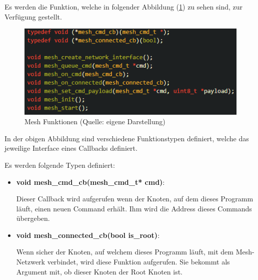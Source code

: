Es werden die Funktion, welche in folgender Abbildung (\ref{abb:mesh_functions}) zu sehen sind, zur Verfügung gestellt.

\begin{figure}[H]
    \begin{center}
        \includegraphics[scale=1]{images/mesh_functions.png}
        \caption{Mesh Funktionen (Quelle: eigene Darstellung)}
        \label{abb:mesh_functions}
    \end{center}
\end{figure}

In der obigen Abbildung sind verschiedene Funktionstypen definiert, welche das jeweilige Interface eines Callbacks definiert.

Es werden folgende Typen definiert:

\begin{itemize}
    \item \textbf{void mesh\_cmd\_cb(mesh\_cmd\_t* cmd)}:

    Dieser Callback wird aufgerufen wenn der Knoten, auf dem dieses Programm läuft, einen neuen Command erhält. Ihm wird die Address dieses Commands übergeben.

    \item \textbf{void mesh\_connected\_cb(bool is\_root)}:
    
    Wenn sicher der Knoten, auf welchem dieses Programm läuft, mit dem Mesh-Netzwerk verbindet, wird diese Funktion aufgerufen. Sie bekommt als Argument mit, ob dieser Knoten der Root Knoten ist.
\end{itemize}

